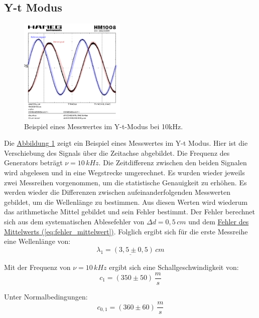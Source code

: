 \subsection{Y-t Modus}
\begin{figure}[!ht]
    \centering
    \includegraphics[width=0.45\textwidth]{img/26/SinusRef.pdf}
    \caption{Beispiel eines Messwertes im Y-t-Modus bei 10kHz.}
    \label{fig:yt_modus}
\end{figure}

Die \hyperref[ig:yt_modus]{Abbildung \ref*{fig:yt_modus}} zeigt ein Beispiel eines Messwertes im Y-t Modus. Hier ist die Verschiebung des Signals über die Zeitachse abgebildet. Die Frequenz des Generators beträgt $\nu = 10\,kHz$. Die Zeitdifferenz zwischen den beiden Signalen wird abgelesen und in eine Wegstrecke umgerechnet. 
Es wurden wieder jeweils zwei Messreihen vorgenommen, um die statistische Genauigkeit zu erhöhen. Es werden wieder die Differenzen zwischen aufeinanderfolgenden Messwerten gebildet, um die Wellenlänge zu bestimmen. Aus diesen Werten wird wiederum das arithmetische Mittel gebildet und sein Fehler bestimmt. Der Fehler berechnet sich aus dem systematischen Ablesefehler von $\Delta d = 0,5\,cm$ und dem \hyperref[eq:fehler_mittelwert]{Fehler des Mittelwerts (\ref*{eq:fehler_mittelwert})}. Folglich ergibt sich für die erste Messreihe eine Wellenlänge von:
\begin{equation}
    \underline{
        \lambda_1 = (3,5 \pm 0,5)\,cm
    }
\end{equation}

Mit der Frequenz von $\nu = 10\,kHz$ ergibt sich eine Schallgeschwindigkeit von:
\begin{equation}
    \boxed{
        c_1 = (350 \pm 50)\,\frac{m}{s}
    }
\end{equation}

Unter Normalbedingungen:
\begin{equation}
    \boxed{
        c_{0,1} = (360 \pm 60)\,\frac{m}{s}
    }
\end{equation}

